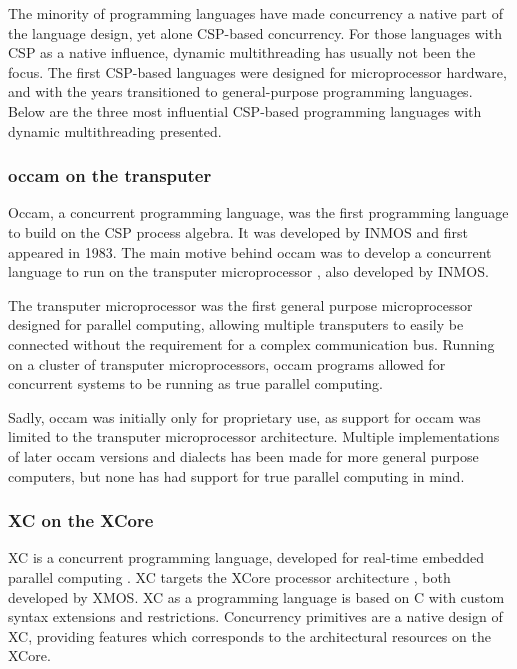 The minority of programming languages have made concurrency a native part of the language design, yet alone CSP\hyp{}based concurrency. For those languages with CSP as a native influence, dynamic multithreading has usually not been the focus. The first CSP\hyp{}based languages were designed for microprocessor hardware, and with the years transitioned to general\hyp{}purpose programming languages. Below are the three most influential CSP\hyp{}based programming languages with dynamic multithreading presented.


\subsubsection{occam on the transputer}


Occam, a concurrent programming language, was the first programming language to build on the CSP process algebra. It was developed by INMOS \citep{may1983occam} and first appeared in 1983. The main motive behind occam was to develop a concurrent language to run on the transputer microprocessor \citep{may1984occam}, also developed by INMOS.

The transputer microprocessor was the first general purpose microprocessor designed for parallel computing, allowing multiple transputers to easily be connected without the requirement for a complex communication bus. Running on a cluster of transputer microprocessors, occam programs allowed for concurrent systems to be running as true parallel computing.

Sadly, occam was initially only for proprietary use, as support for occam was limited to the transputer microprocessor architecture. Multiple implementations of later occam versions and dialects has been made for more general purpose computers, but none has had support for true parallel computing in mind.


\subsubsection{XC on the XCore}


XC is a concurrent programming language, developed for real\hyp{}time embedded parallel computing \citep{watt2009programming}. XC targets the XCore processor architecture \citep{may2009xmos}, both developed by XMOS. XC as a programming language is based on C with custom syntax extensions and restrictions. Concurrency primitives are a native design of XC, providing features which corresponds to the architectural resources on the XCore.

